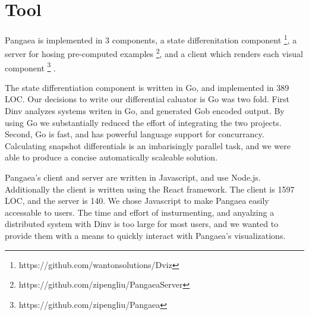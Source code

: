 \section{Tool}
\label{sec:tool}

Pangaea is implemented in 3 components, a state differenitation
component \footnote{https://github.com/wantonsolutions/Dviz}, a server
for hosing pre-computed examples
\footnote{https://github.com/zipengliu/PangaeaServer}, and a client
which renders each visual component
\footnote{https://github.com/zipengliu/Pangaea} .

The state differentiation component is written in Go, and implemented
in 389 LOC. Our decisions to write our differential caluator is Go was
two fold. First Dinv analyzes systems writen in Go, and generated Gob
encoded output. By using Go we substantially reduced the effort of
integrating the two projects. Second, Go is fast, and has powerful
language support for concurrancy. Calculating snapshot differentials
is an imbarisingly parallel task, and we were able to produce a
concise automatically scaleable solution.

Pangaea's client and server are written in Javascript, and use
Node.js. Additionally the client is written using the React framework.
The client is 1597 LOC, and the server is 140. We chose Javascript to
make Pangaea easily accessable to users. The time and effort of
insturmenting, and anyalzing a distributed system with Dinv is too
large for most users, and we wanted to provide them with a means to
quickly interact with Pangaea's visualizations.
